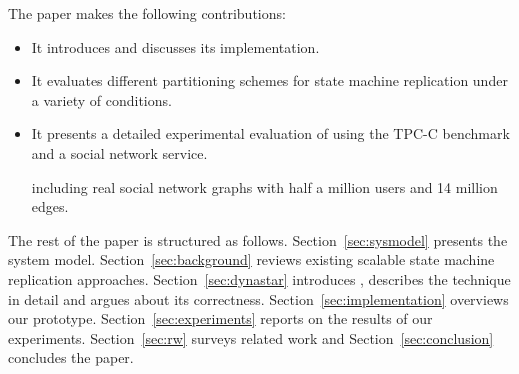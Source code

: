 The paper makes the following contributions:
\begin{itemize}
\item It introduces \dynastar and discusses its implementation. 
\item It evaluates different partitioning schemes for state machine replication under a variety of conditions.
\item It presents a detailed experimental evaluation of \dynastar using the TPC-C benchmark and a social network service.

including real social network graphs with half a million users and 14 million edges.
\end{itemize}

The rest of the paper is structured as follows.
Section~\ref{sec:sysmodel} presents the system model.
Section~\ref{sec:background} reviews existing scalable state machine replication approaches.
Section~\ref{sec:dynastar} introduces \dynastar, describes the technique in detail and argues about its correctness.
Section~\ref{sec:implementation} overviews our prototype.
Section~\ref{sec:experiments} reports on the results of our experiments.
Section~\ref{sec:rw} surveys related work and
Section~\ref{sec:conclusion} concludes the paper.
